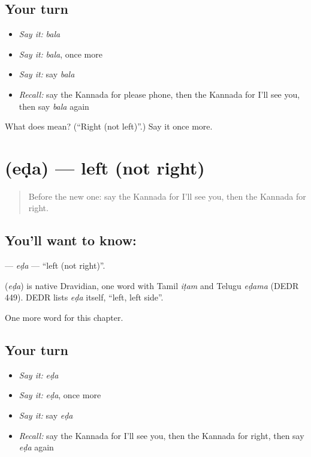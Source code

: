 \subsection*{Your turn}
\begin{itemize}
\raggedright
  \item \emph{Say it:} \emph{bala}
  \item \emph{Say it:} \emph{bala}, once more
  \item \emph{Say it:} say \emph{bala}
  \item \emph{Recall:} say the Kannada for please phone, then the Kannada for I'll see you, then say \emph{bala} again
\end{itemize}

\begin{tcolorbox}[breakable,colback=teal!4,colframe=teal!35!black,title={Before you move on}]
What does  mean? (\textquotedblleft{}Right (not left)\textquotedblright{}.) Say it once more.
\end{tcolorbox}
\section[\texorpdfstring{\kn{ಎಡ} (eḍa)}{ಎಡ (eḍa)}]{ (eḍa) — left (not right)}

\label{lesson:KA-C107-eda}



\begin{quote}
Before the new one: say the Kannada for I'll see you, then the Kannada for right.
\end{quote}

\subsection*{You'll want to know: }
\textbf{} — \emph{eḍa} — \textquotedblleft{}left (not right)\textquotedblright{}.

\begin{cousinweb}
\textbf{} (\emph{eḍa}) is native Dravidian, one word with Tamil \emph{iṭam} and Telugu \emph{eḍama} (DEDR 449). DEDR lists \emph{eḍa} itself, \textquotedblleft{}left, left side\textquotedblright{}.
\end{cousinweb}

\begin{grammarlens}[title={What you've built}]
One more word for this chapter.
\end{grammarlens}

\subsection*{Your turn}
\begin{itemize}
\raggedright
  \item \emph{Say it:} \emph{eḍa}
  \item \emph{Say it:} \emph{eḍa}, once more
  \item \emph{Say it:} say \emph{eḍa}
  \item \emph{Recall:} say the Kannada for I'll see you, then the Kannada for right, then say \emph{eḍa} again
\end{itemize}

